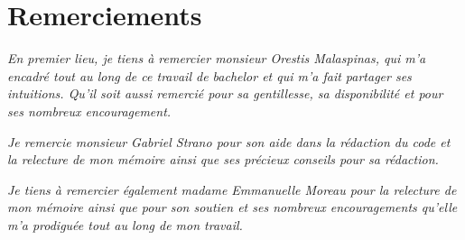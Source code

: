 \chapter*{Remerciements} %

\textit{En premier lieu, je tiens à remercier monsieur Orestis Malaspinas, qui
m'a encadré tout au long de ce travail de bachelor et qui m'a fait partager ses
intuitions. Qu'il soit aussi remercié pour sa gentillesse, sa disponibilité et
pour ses nombreux encouragement.}

\textit{Je remercie monsieur Gabriel Strano pour son aide dans la rédaction du
	code et	la relecture de mon mémoire ainsi que ses précieux conseils pour sa
rédaction.}

\textit{Je tiens à remercier également madame Emmanuelle Moreau pour la 
	relecture de mon mémoire ainsi que pour son soutien et ses nombreux 
	encouragements qu'elle m'a prodiguée tout au long de mon travail.}



